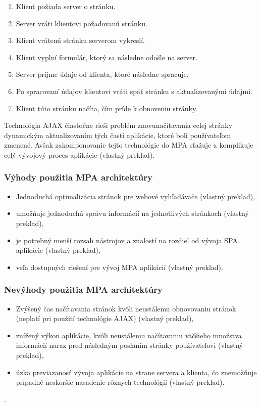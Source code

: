 \begin{enumerate}
	\item Klient požiada server o stránku.
	\item Server vráti klientovi požadovanú stránku.
	\item Klient vrátenú stránku serverom vykreslí.
	\item Klient vyplní formulár, ktorý sa následne odošle na server.
	\item Server prijme údaje od klienta, ktoré následne spracuje.
	\item Po spracovaní údajov klientovi vráti späť stránku s aktualizovanými údajmi.
	\item Klient túto stránku načíta, čím príde k obnoveniu stránky.
\end{enumerate}

Technológia AJAX čiastočne rieši problém znovunačítavania celej stránky dynamickým aktualizovaním tých častí aplikácie, ktoré boli používateľom zmenené. Avšak zakomponovanie tejto technológie do MPA sťažuje a komplikuje celý vývojový proces aplikácie \cite{mpa-architektura} (vlastný preklad).

\subsubsection*{Výhody použitia MPA architektúry}

\begin{itemize}
	\item Jednoduchá optimalizácia stránok pre webové vyhľadávače \cite{spa-vs-mpa-1} (vlastný preklad),
	\item umožňuje jednoduchú správu informácií na jednotlivých stránkach \cite{spa-vs-mpa-3} (vlastný preklad),
	\item je potrebný menší rozsah nástrojov a znalostí na rozdiel od vývoja SPA aplikácie \cite{spa-vs-mpa-2} (vlastný preklad),
	\item veľa dostupných riešení pre vývoj MPA aplikácií \cite{spa-vs-mpa-2} (vlastný preklad).
\end{itemize}


\subsubsection*{Nevýhody použitia MPA architektúry}

\begin{itemize}
	\item Zvýšený čas načítavania stránok kvôli neustálemu obnovovaniu stránok (neplatí pri použití technológie AJAX) \cite{spa-vs-mpa-1} (vlastný preklad),
	\item znížený výkon aplikácie, kvôli neustálemu načítavaniu väčšieho množstva informácií naraz pred následným poslaním stránky používateľovi \cite{spa-vs-mpa-1} (vlastný preklad),
	\item úzka previazanosť vývoja aplikácie na strane servera a klienta, čo znemožňuje prípadné neskoršie nasadenie rôznych technológií \cite{spa-vs-mpa-2} (vlastný preklad).
\end{itemize}.


